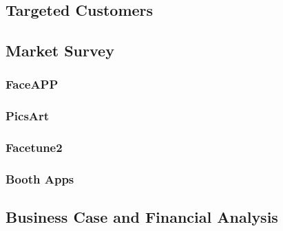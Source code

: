 \subsection{Targeted Customers}

\subsection{Market Survey}

\subsubsection{FaceAPP}

\subsubsection{PicsArt}

\subsubsection{Facetune2}

\subsubsection{Booth Apps}

\subsection{Business Case and Financial Analysis }
